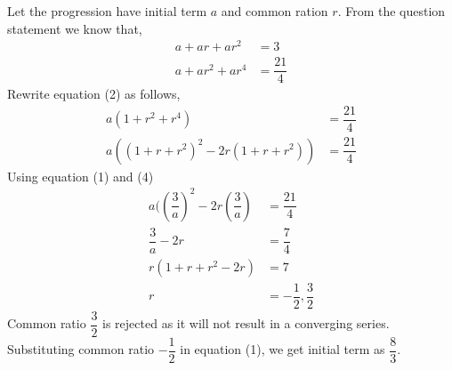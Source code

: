 \begin{solution}[\fullpage]
  Let the progression have initial term $a$ and common ration $r$. From the question statement we know that,
  \begin{align}
    a+ar+ar^2   &= 3 \\
    a+ar^2+ar^4 &= \dfrac{21}{4}
  \end{align}
  Rewrite equation (2) as follows,
  \begin{align}
    a(1+r^2+r^4)               &= \dfrac{21}{4} \\
	a((1+r+r^2)^2-2r(1+r+r^2)) &= \dfrac{21}{4}
  \end{align}
  Using equation (1) and (4)
  \begin{align}
    a((\dfrac{3}{a})^2-2r(\dfrac{3}{a}) &= \dfrac{21}{4} \\
    \dfrac{3}{a}-2r                     &= \dfrac{7}{4} \\
    r(1+r+r^2-2r)                       &= 7 \\
    r                                   &= -\dfrac{1}{2},\dfrac{3}{2}
  \end{align}
  Common ratio $\dfrac{3}{2}$ is rejected as it will not result in a converging series. Substituting common ratio $-\dfrac{1}{2}$ in equation (1), we get initial term as $\dfrac{8}{3}$.

\end{solution}
